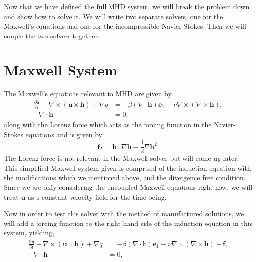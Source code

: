 \documentclass{article}
\begin{document}
Now that we have defined the full MHD system, we will break the problem down and show how to solve it. We will write two separate solvers, one for the Maxwell's equations and one for the incompressible Navier-Stokes. Then we will couple the two solvers together. 

\section*{Maxwell System}
The Maxwell's equations relevant to MHD are given by
\begin{align*}
    \frac{\partial \boldsymbol{h} }{\partial t} - \nabla \times (\boldsymbol{u}\times \boldsymbol{h}) +\nabla q &=- \beta (\nabla \cdot \boldsymbol{h})\boldsymbol{e}_1 -\nu \nabla \times (\nabla \times \boldsymbol{h}), \\
    -\nabla \cdot \boldsymbol{h} &= 0,
\end{align*}
along with the Lorenz force which acts as the forcing function in the Navier-Stokes equations and is given by
\[
    \boldsymbol{f}_L =  \boldsymbol{h}\cdot \nabla \boldsymbol{h} - \frac{1}{2}\nabla \boldsymbol{h}^2.
\]
The Lorenz force is not relevant in the Maxwell solver but will come up later. 
This simplified Maxwell system given is comprised of the induction equation with the modifications which we mentioned above, and the divergence free condition. Since we are only considering the uncoupled Maxwell equations right now, we will treat $\boldsymbol{u}$ as a constant velocity field for the time being. 

Now in order to test this solver with the method of manufactured solutions, we will add a forcing function to the right hand side of the induction equation in this system, yielding, 
\begin{align*}
    \frac{\partial \boldsymbol{h} }{\partial t} - \nabla \times (\boldsymbol{u}\times \boldsymbol{h}) +\nabla q &=- \beta (\nabla \cdot \boldsymbol{h})\boldsymbol{e}_1 -\nu \nabla \times (\nabla \times \boldsymbol{h}) + \boldsymbol{f}, \\
    -\nabla \cdot \boldsymbol{h} &= 0,
\end{align*}
\end{document}
